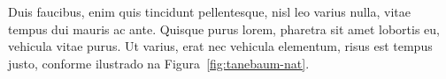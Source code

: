 Duis faucibus, enim quis tincidunt pellentesque, nisl leo varius nulla, vitae tempus dui mauris ac ante. Quisque purus lorem, pharetra sit amet lobortis eu, vehicula vitae purus. Ut varius, erat nec vehicula elementum, risus est tempus justo, conforme ilustrado na Figura~\ref{fig:tanebaum-nat}.

\begin{figure}[h!]
	\centering
\end{figure}
